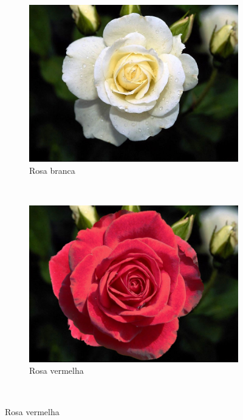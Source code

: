 \begin{figure}[H]
  \centering

  \begin{subfigure}{0.3\textwidth}
    \includegraphics[width=\textwidth]{imagens/flor_branca.jpg}
    \caption{Rosa branca}
    \label{fig:flor1}
  \end{subfigure}~
  \begin{subfigure}{0.3\textwidth}
    \includegraphics[width=\textwidth]{imagens/flor_vermelha.jpg}
    \caption{Rosa vermelha}
    \label{fig:flor2}
  \end{subfigure}~


\end{figure}

